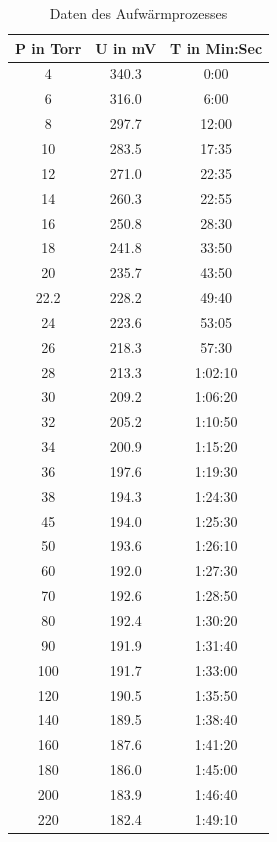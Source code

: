 \documentclass[bigchapter,colorback,accentcolor=tud4b,linedtoc,11pt]{tudreport}
\begin{document}
 \begin{center}
 \begin{table}[H]
 \caption{Daten des Aufwärmprozesses}
 \begin{center}
 \begin{tabular}{|c|c|c|}
P in Torr &    U in mV &   T in Min:Sec \\ \hline
4        &     340.3   &  0:00 \\ \hline
6        &     316.0   &  6:00 \\ \hline
8        &     297.7   &  12:00 \\ \hline
10       &     283.5   &  17:35 \\ \hline
12       &     271.0   &  22:35 \\ \hline
14       &     260.3   &  22:55 \\ \hline
16       &     250.8   &  28:30 \\ \hline
18       &     241.8   &  33:50 \\ \hline 
20       &     235.7   &  43:50 \\ \hline
22.2     &     228.2   &  49:40 \\ \hline
24       &     223.6   &  53:05 \\ \hline
26       &     218.3   &  57:30 \\ \hline
28       &     213.3   &  1:02:10 \\ \hline
30       &     209.2   &  1:06:20 \\ \hline
32       &     205.2   &  1:10:50 \\ \hline
34       &     200.9   &  1:15:20 \\ \hline
36       &     197.6   &  1:19:30 \\ \hline
38       &     194.3   &  1:24:30 \\ \hline
45       &     194.0   &  1:25:30 \\ \hline
50       &     193.6   &  1:26:10 \\ \hline
60       &     192.0   &  1:27:30 \\ \hline
70       &     192.6   &  1:28:50 \\ \hline
80       &     192.4   &  1:30:20 \\ \hline
90       &     191.9   &  1:31:40 \\ \hline
100      &     191.7   &  1:33:00 \\ \hline
120      &     190.5   &  1:35:50 \\ \hline
140      &     189.5   &  1:38:40 \\ \hline
160      &     187.6   &  1:41:20 \\ \hline
180      &     186.0   &  1:45:00 \\ \hline
200      &     183.9   &  1:46:40 \\ \hline
220      &     182.4   &  1:49:10 \\ \hline
  \end{tabular}
  \end{center}
 \label{tab:aufwärm}
 \end{table}  
\end{center}
\end{document}
